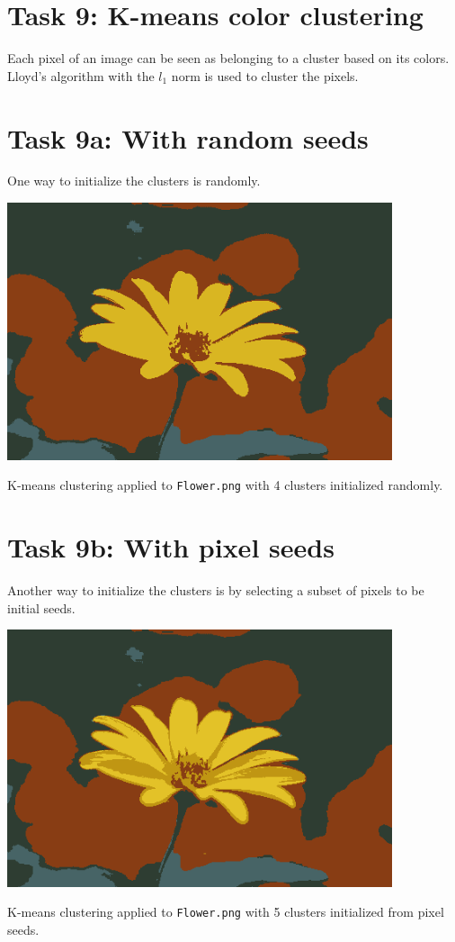 \documentclass[letterpaper]{article}
\begin{document}
\section*{Task 9: K-means color clustering}

Each pixel of an image can be seen as belonging to a cluster based on its
colors. Lloyd's algorithm with the $l_1$ norm is used to cluster the pixels.

\section*{Task 9a: With random seeds}

One way to initialize the clusters is randomly.

\begin{center}
  \includegraphics[width=0.85\textwidth]{task9a.png}
  
  K-means clustering applied to \texttt{Flower.png} with 4 clusters initialized
  randomly.
\end{center}

\section*{Task 9b: With pixel seeds}

Another way to initialize the clusters is by selecting a subset of pixels to be
initial seeds.

\begin{center}
  \includegraphics[width=0.85\textwidth]{task9b.png}
  
  K-means clustering applied to \texttt{Flower.png} with 5 clusters initialized
  from pixel seeds.
\end{center}
\end{document}
